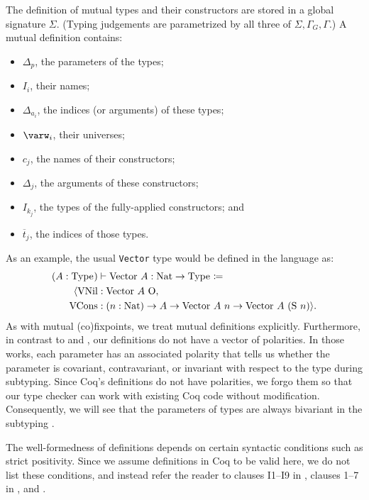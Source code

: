 \documentclass[sigplan,10pt,anonymous,review]{acmart}
\begin{document}


The definition of mutual \coinductive types and their constructors are stored in a global signature $\Sigma$. (Typing judgements are parametrized by all three of $\Sigma, \Gamma_G, \Gamma$.) A mutual \coinductive definition contains:

\begin{itemize}
    \item $\Delta_p$, the parameters of the \coinductive types;
    \item $I_i$, their names;
    \item $\Delta_{a_i}$, the indices (or arguments) of these \coinductive types;
    \item $\varw_i$, their universes;
    \item $c_j$, the names of their constructors;
    \item $\Delta_j$, the arguments of these constructors;
    \item $I_{k_j}$, the \coinductive types of the fully-applied constructors; and
    \item $\overline{t}_j$, the indices of those \coinductive types.
\end{itemize}

As an example, the usual \texttt{Vector} type would be defined in the language as:
\begin{align*}
    (A : \Type{}) &\vdash \text{Vector}\ A: \text{Nat} \to \Type{} \coloneqq \\
        \langle \text{VNil} &: \text{Vector}\ A\ \text{O}, \\
        \text{VCons} &: (n: \text{Nat}) \to A \to \text{Vector}\ A\ n \to \text{Vector}\ A\ (\text{S}\ n) \rangle.
\end{align*}
As with mutual (co)\-fixpoints, we treat mutual \coinductive definitions explicitly. Furthermore, in contrast to \CIChat and \CIChatbar, our definitions do not have a vector of polarities. In those works, each parameter has an associated polarity that tells us whether the parameter is covariant, contravariant, or invariant with respect to the \coinductive type during subtyping. Since Coq's \coinductive definitions do not have polarities, we forgo them so that our type checker can work with existing Coq code without modification. Consequently, we will see that the parameters of \coinductive types are always bivariant in the subtyping .

The well-formedness of \coinductive definitions depends on certain syntactic conditions such as strict positivity. Since we assume definitions in Coq to be valid here, we do not list these conditions, and instead refer the reader to clauses I1--I9 in \cite{cic-hat-bar}, clauses 1--7 in \cite{cic-hat}, and \cite{coq}.
\end{document}
